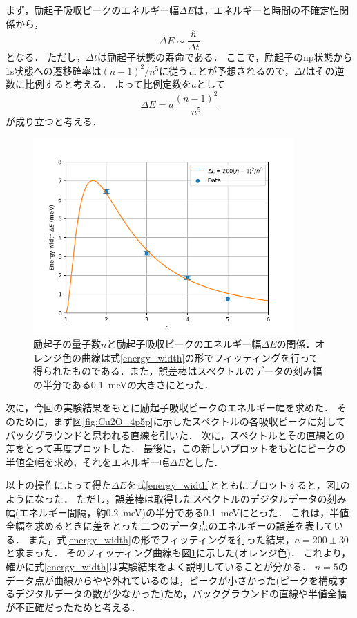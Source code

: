 \documentclass[titlepage]{jsarticle}
\begin{document}
まず，励起子吸収ピークのエネルギー幅$\Delta E$は，エネルギーと時間の不確定性関係から，
\begin{equation}
  \Delta E \sim \frac{\hbar}{\Delta t}
\end{equation}
となる．
ただし，$\Delta t$は励起子状態の寿命である．
ここで，励起子のnp状態から1s状態への遷移確率は$(n-1)^2/n^5$に従うことが予想されるので，$\Delta t$はその逆数に比例すると考える．
よって比例定数を$a$として
\begin{equation}
  \Delta E = a \frac{(n-1)^2}{n^5} \label{energy_width}
\end{equation}
が成り立つと考える．

\begin{figure}[htbp]
  \centering
  \includegraphics[width=10cm]{Cu2O_energy_width.png}
  \caption{励起子の量子数$n$と励起子吸収ピークのエネルギー幅$\Delta E$の関係．オレンジ色の曲線は式\eqref{energy_width}の形でフィッティングを行って得られたものである．また，誤差棒はスペクトルのデータの刻み幅の半分である\SI{0.1}{\meV}の大きさにとった．}
  \label{fig:Cu2O_energy_width}
\end{figure}

次に，今回の実験結果をもとに励起子吸収ピークのエネルギー幅を求めた．
そのために，まず図\ref{fig:Cu2O_4p5p}に示したスペクトルの各吸収ピークに対してバックグラウンドと思われる直線を引いた．
次に，スペクトルとその直線との差をとって再度プロットした．
最後に，この新しいプロットをもとにピークの半値全幅を求め，それをエネルギー幅$\Delta E$とした．

以上の操作によって得た$\Delta E$を式\eqref{energy_width}とともにプロットすると，図\ref{fig:Cu2O_energy_width}のようになった．
ただし，誤差棒は取得したスペクトルのデジタルデータの刻み幅(エネルギー間隔，約\SI{0.2}{\meV})の半分である\SI{0.1}{\meV}にとった．
これは，半値全幅を求めるときに差をとった二つのデータ点のエネルギーの誤差を表している．
また，式\eqref{energy_width}の形でフィッティングを行った結果，$a=200\pm 30$と求まった．
そのフィッティング曲線も図\ref{fig:Cu2O_energy_width}に示した(オレンジ色)．
これより，確かに式\eqref{energy_width}は実験結果をよく説明していることが分かる．
$n=5$のデータ点が曲線からやや外れているのは，ピークが小さかった(ピークを構成するデジタルデータの数が少なかった)ため，バックグラウンドの直線や半値全幅が不正確だったためと考える．
\end{document}
